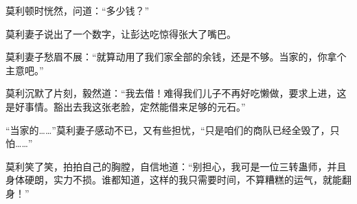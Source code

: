 \begin{this_body}
莫利顿时恍然，问道：“多少钱？”

莫利妻子说出了一个数字，让彭达吃惊得张大了嘴巴。

莫利妻子愁眉不展：“就算动用了我们家全部的余钱，还是不够。当家的，你拿个主意吧。”

莫利沉默了片刻，毅然道：“我去借！难得我们儿子不再好吃懒做，要求上进，这是好事情。豁出去我这张老脸，定然能借来足够的元石。”

“当家的……”莫利妻子感动不已，又有些担忧，“只是咱们的商队已经全毁了，只怕……”

莫利笑了笑，拍拍自己的胸膛，自信地道：“别担心，我可是一位三转蛊师，并且身体硬朗，实力不损。谁都知道，这样的我只需要时间，不算糟糕的运气，就能翻身！”

\end{this_body}

